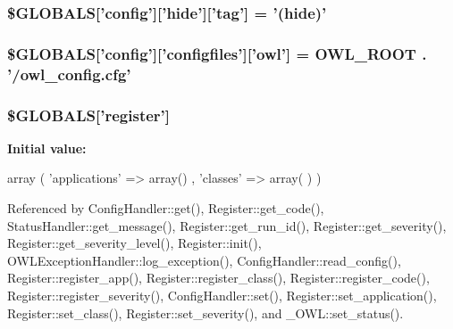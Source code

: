 \subsubsection[{\$GLOBALS}]{\setlength{\rightskip}{0pt plus 5cm}\$GLOBALS\mbox{[}'config'\mbox{]}\mbox{[}'hide'\mbox{]}\mbox{[}'tag'\mbox{]} = '(hide)'}\label{config_8php_a15cc7b8e0baf358db666b97bd9c7fcf5}
\subsubsection[{\$GLOBALS}]{\setlength{\rightskip}{0pt plus 5cm}\$GLOBALS\mbox{[}'config'\mbox{]}\mbox{[}'configfiles'\mbox{]}\mbox{[}'owl'\mbox{]} = {\bf OWL\_\-ROOT} . '/owl\_\-config.cfg'}\label{config_8php_a36e909583250c43d72bdc7c09e2d4a20}
\subsubsection[{\$GLOBALS}]{\setlength{\rightskip}{0pt plus 5cm}\$GLOBALS\mbox{[}'register'\mbox{]}}\label{config_8php_a6cc1ef3a8c20d69988531d27f931855b}
{\bfseries Initial value:}
\begin{DoxyCode}
 array (
                                          'applications'        => array()
                                        , 'classes'                     => array(
      )
                                )
\end{DoxyCode}


Referenced by ConfigHandler::get(), Register::get\_\-code(), StatusHandler::get\_\-message(), Register::get\_\-run\_\-id(), Register::get\_\-severity(), Register::get\_\-severity\_\-level(), Register::init(), OWLExceptionHandler::log\_\-exception(), ConfigHandler::read\_\-config(), Register::register\_\-app(), Register::register\_\-class(), Register::register\_\-code(), Register::register\_\-severity(), ConfigHandler::set(), Register::set\_\-application(), Register::set\_\-class(), Register::set\_\-severity(), and \_\-OWL::set\_\-status().

